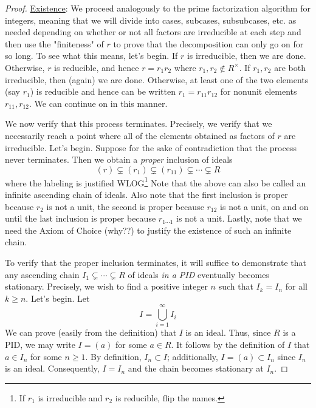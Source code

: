 \documentclass[../notes.tex]{subfiles}
\begin{document}
\begin{itemize}
\begin{theorem}
\begin{proof}
            \underline{Existence}: We proceed analogously to the prime factorization algorithm for integers, meaning that we will divide into cases, subcases, subsubcases, etc. as needed depending on whether or not all factors are irreducible at each step and then use the "finiteness" of $r$ to prove that the decomposition can only go on for so long. To see what this means, let's begin. If $r$ is irreducible, then we are done. Otherwise, $r$ is reducible, and hence $r=r_1r_2$ where $r_1,r_2\notin R^\times$. If $r_1,r_2$ are both irreducible, then (again) we are done. Otherwise, at least one of the two elements (say $r_1$) is reducible and hence can be written $r_1=r_{11}r_{12}$ for nonunit elements $r_{11},r_{12}$. We can continue on in this manner.\par
            We now verify that this process terminates. Precisely, we verify that we necessarily reach a point where all of the elements obtained as factors of $r$ are irreducible. Let's begin. Suppose for the sake of contradiction that the process never terminates. Then we obtain a \emph{proper} inclusion of ideals
            \begin{equation*}
                (r) \subsetneq (r_1) \subsetneq (r_{11}) \subsetneq \cdots \subsetneq R
            \end{equation*}
            where the labeling is justified WLOG\footnote{If $r_1$ is irreducible and $r_2$ is reducible, flip the names.} Note that the above can also be called an infinite ascending chain of ideals. Also note that the first inclusion is proper because $r_2$ is not a unit, the second is proper because $r_{12}$ is not a unit, on and on until the last inclusion is proper because $r_{1\cdots 1}$ is not a unit. Lastly, note that we need the Axiom of Choice (why??) to justify the existence of such an infinite chain.\par
            To verify that the proper inclusion terminates, it will suffice to demonstrate that any ascending chain $I_1\subsetneq\cdots\subsetneq R$ of ideals \emph{in a PID} eventually becomes stationary. Precisely, we wish to find a positive integer $n$ such that $I_k=I_n$ for all $k\geq n$. Let's begin. Let
            \begin{equation*}
                I = \bigcup_{i=1}^\infty I_i
            \end{equation*}
            We can prove (easily from the definition) that $I$ is an ideal. Thus, since $R$ is a PID, we may write $I=(a)$ for some $a\in R$. It follows by the definition of $I$ that $a\in I_n$ for some $n\geq 1$. By definition, $I_n\subset I$; additionally, $I=(a)\subset I_n$ since $I_n$ is an ideal. Consequently, $I=I_n$ and the chain becomes stationary at $I_n$.\par

\end{proof}
\end{theorem}
\end{itemize}
\end{document}
